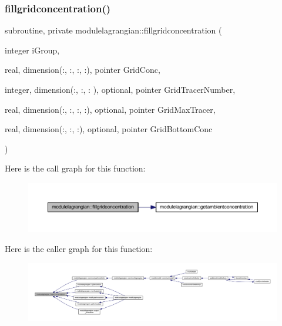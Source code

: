 \subsubsection{\texorpdfstring{fillgridconcentration()}{fillgridconcentration()}}
{\footnotesize\ttfamily subroutine, private modulelagrangian\+::fillgridconcentration (\begin{DoxyParamCaption}\item[{integer}]{i\+Group,  }\item[{real, dimension(\+:, \+:, \+:, \+:), pointer}]{Grid\+Conc,  }\item[{integer, dimension(\+:, \+:, \+:   ), optional, pointer}]{Grid\+Tracer\+Number,  }\item[{real, dimension(\+:, \+:, \+:, \+:), optional, pointer}]{Grid\+Max\+Tracer,  }\item[{real, dimension(\+:, \+:,    \+:), optional, pointer}]{Grid\+Bottom\+Conc }\end{DoxyParamCaption})\hspace{0.3cm}{\ttfamily [private]}}

Here is the call graph for this function\+:\nopagebreak
\begin{figure}[H]
\begin{center}
\leavevmode
\includegraphics[width=350pt]{namespacemodulelagrangian_a841c52a7705b666c34f7c0874d5c88d6_cgraph}
\end{center}
\end{figure}
Here is the caller graph for this function\+:\nopagebreak
\begin{figure}[H]
\begin{center}
\leavevmode
\includegraphics[width=350pt]{namespacemodulelagrangian_a841c52a7705b666c34f7c0874d5c88d6_icgraph}
\end{center}
\end{figure}
\mbox{\label{namespacemodulelagrangian_a8232b9379a8d2919b7885bb92a286601}} 
